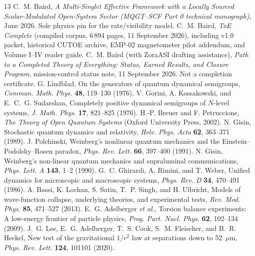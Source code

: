 \documentclass[11pt]{article}
\theoremstyle{definition}
\theoremstyle{plain}
\begin{document}
\begin{thebibliography}{13}
 C.~M. Baird, \emph{A Multi-Singlet Effective Framework with a Locally Sourced
Scalar-Modulated Open-System Sector (MQGT--SCF Part 0 technical monograph)}, June 2026.
Sole physics pin for the rate/visibility model.
 C.~M. Baird, \emph{ToE Complete} (compiled corpus, 6\,894 pages, 11 September 2026),
including v1.0 packet, historical CUTOE archive, EMP-02 magnetometer pilot addendum, and
Volume I--IV reader guide.
 C.~M. Baird (with ZoraASI drafting assistance), \emph{Path to a Completed Theory of
Everything: Status, Earned Results, and Closure Program}, mission-control status note, 11 September
2026. Not a completion certificate.
 G. Lindblad, On the generators of quantum dynamical semigroups, \emph{Commun.
Math. Phys.} \textbf{48}, 119--130 (1976).
 V. Gorini, A. Kossakowski, and E.~C.~G. Sudarshan, Completely positive dynamical
semigroups of $N$-level systems, \emph{J. Math. Phys.} \textbf{17}, 821--825 (1976).
 H.-P. Breuer and F. Petruccione, \emph{The Theory of Open Quantum Systems}
(Oxford University Press, 2002).
 N. Gisin, Stochastic quantum dynamics and relativity, \emph{Helv. Phys. Acta} \textbf{62},
363--371 (1989).
 J. Polchinski, Weinberg's nonlinear quantum mechanics and the
Einstein--Podolsky--Rosen paradox, \emph{Phys. Rev. Lett.} \textbf{66}, 397--400 (1991).
 N. Gisin, Weinberg's non-linear quantum mechanics and supraluminal communications,
\emph{Phys. Lett. A} \textbf{143}, 1--2 (1990).
 G.~C. Ghirardi, A. Rimini, and T. Weber, Unified dynamics for microscopic and
macroscopic systems, \emph{Phys. Rev. D} \textbf{34}, 470--491 (1986).
 A. Bassi, K. Lochan, S. Satin, T.~P. Singh, and H. Ulbricht, Models of wave-function
collapse, underlying theories, and experimental tests, \emph{Rev. Mod. Phys.} \textbf{85}, 471--527 (2013).
 E.~G. Adelberger \emph{et al.}, Torsion balance experiments: A low-energy frontier
of particle physics, \emph{Prog. Part. Nucl. Phys.} \textbf{62}, 102--134 (2009).
 J.~G. Lee, E.~G. Adelberger, T.~S. Cook, S.~M. Fleischer, and B.~R. Heckel, New test
of the gravitational $1/r^2$ law at separations down to 52~$\mu$m, \emph{Phys. Rev. Lett.} \textbf{124},
101101 (2020).
\end{thebibliography}
\end{document}
